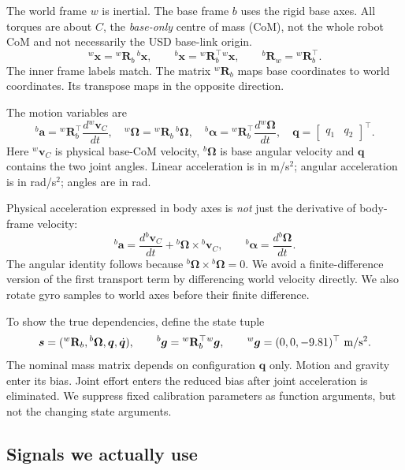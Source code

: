 \documentclass[11pt,a4paper]{article}
\newcommand{\vct}[1]{\boldsymbol{#1}}
\newcommand{\mat}[1]{\mathbf{#1}}
\newcommand{\bv}[1]{{}^{b}\vct{#1}}
\newcommand{\wv}[1]{{}^{w}\vct{#1}}
\newcommand{\Rw}{{}^{w}\mat R_b}
\begin{document}
The world frame $w$ is inertial. The base frame $b$ uses the rigid base axes.
All torques are about $C$, the \emph{base-only} centre of mass (CoM), not the
whole robot CoM and not necessarily the USD base-link origin.
\begin{equation}
\wv x=\Rw\,\bv x,\qquad
\bv x=\Rw^\top\wv x,\qquad
{}^b\mat R_w=\Rw^\top.
\label{eq:frames}
\end{equation}
The inner frame labels match. The matrix $\Rw$ maps base coordinates to world
coordinates. Its transpose maps in the opposite direction.

The motion variables are
\begin{equation}
\bv a=\Rw^\top\frac{d\wv v_C}{dt},\quad
\wv\Omega=\Rw\,\bv\Omega,\quad
\bv\alpha=\Rw^\top\frac{d\wv\Omega}{dt},\quad
\vct q=\begin{bmatrix}q_1&q_2\end{bmatrix}^{\!\top}.
\label{eq:accelerations}
\end{equation}
Here $\wv v_C$ is physical base-CoM velocity, $\bv\Omega$ is base angular
velocity and $\vct q$ contains the two joint angles. Linear acceleration is in
m/s$^2$; angular acceleration is in rad/s$^2$; angles are in rad.

Physical acceleration expressed in body axes is \emph{not} just the derivative
of body-frame velocity:
\begin{equation}
\bv a=\frac{d\bv v_C}{dt}+\bv\Omega\times\bv v_C,
\qquad \bv\alpha=\frac{d\bv\Omega}{dt}.
\label{eq:transport}
\end{equation}
The angular identity follows because $\bv\Omega\times\bv\Omega=0$.
We avoid a finite-difference version of the first transport term by differencing
world velocity directly. We also rotate gyro samples to world axes before their
finite difference.

To show the true dependencies, define the state tuple
\begin{equation}
\vct s=(\Rw,\bv\Omega,\vct q,\dot{\vct q}),\qquad
\bv g=\Rw^\top\wv g,\qquad \wv g=(0,0,-9.81)^\top\ {\rm m/s^2}.
\label{eq:state}
\end{equation}
The nominal mass matrix depends on configuration $\vct q$ only. Motion and
gravity enter its bias. Joint effort enters the reduced bias after joint
acceleration is eliminated. We suppress fixed calibration parameters as
function arguments, but not the changing state arguments.

\subsection{Signals we actually use}
\end{document}
